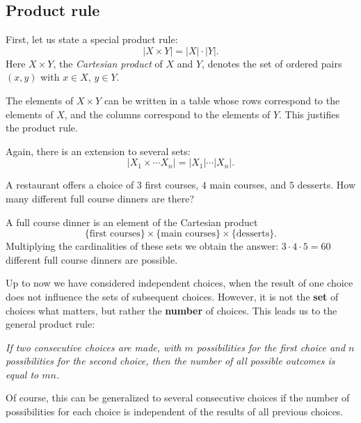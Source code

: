 \begin{page}
\setcounter{section}{1}
\setcounter{subsection}{2}
\setcounter{dfn}{0}
\label{portion:4}

\subsection{Product rule}
First, let us state a special product rule:
\[
|X \times Y| = |X| \cdot |Y|.
\]
Here $X \times Y$, the \emph{Cartesian product} of $X$ and $Y$, denotes the set of ordered pairs $(x,y)$ with $x \in X$, $y \in Y$.

The elements of $X \times Y$ can be written in a table whose rows correspond to the elements of $X$,
and the columns correspond to the elements of $Y$.
This justifies the product rule.

Again, there is an extension to several sets:
\[
|X_1 \times \cdots X_n| = |X_1| \cdots |X_n|.
\]


\end{page}

\begin{page}
\setcounter{section}{1}
\setcounter{subsection}{2}
\setcounter{dfn}{1}
\label{portion:6}

\begin{exl}
A restaurant offers a choice of $3$ first courses, $4$ main courses, and $5$ desserts.
How many different full course dinners are there?

A full course dinner is an element of the Cartesian product
\[
\{\text{first courses}\} \times \{\text{main courses}\} \times \{\text{desserts}\}.
\]
Multiplying the cardinalities of these sets we obtain the answer: $3 \cdot 4 \cdot 5 = 60$ different full course dinners are possible.
\end{exl}

\end{page}

\begin{page}
\setcounter{section}{1}
\setcounter{subsection}{2}
\setcounter{dfn}{1}
\label{portion:7}


Up to now we have considered independent choices,
when the result of one choice does not influence the sets of subsequent choices.
However, it is not the \textbf{set} of choices what matters, but rather the \textbf{number} of choices.
This leads us to the general product rule:
\begin{center}
\parbox{.9\textwidth}{\emph{If two consecutive choices are made, with $m$ possibilities for the first choice and $n$ possibilities for the second choice,
then the number of all possible outcomes is equal to $mn$.}}
\end{center}
Of course, this can be generalized to several consecutive choices
if the number of possibilities for each choice is independent of the results of all previous choices.


\end{page}

